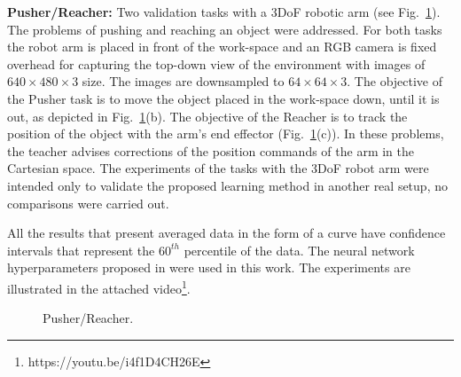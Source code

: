 \textbf{Pusher/Reacher:} Two validation tasks with a 3DoF robotic arm (see Fig.~\ref{fig:PusherReacher}). The problems of pushing  and reaching an object were addressed.  
For both tasks the robot arm is placed in front of the work-space and an RGB camera is fixed overhead for capturing the top-down view of the environment with images of $640\times480\times3$ size. The images are downsampled to $64\times64\times3$. The objective of the Pusher task is to move the object placed in the work-space down, until it is out, as depicted in Fig.~\ref{fig:PusherReacher}(b). The objective of the Reacher is to track the position of the object with the arm's end effector (Fig.~\ref{fig:PusherReacher}(c)). In these problems, the teacher advises corrections of the position commands of the arm in the Cartesian space. The experiments of the tasks with the 3DoF robot arm were intended only to validate the proposed learning method in another real setup, no comparisons were carried out.

All the results that present averaged data in the form of a curve have confidence intervals that represent the $60^{th}$ percentile of the data.
The neural network hyperparameters proposed in \cite{perez2018interactive} were used in this work. The experiments are illustrated in the attached video\footnote{https://youtu.be/i4f1D4CH26E}. 

\begin{figure}[h]
\centering
{} 
\hspace{0.25cm}
\hspace{0.25cm}
\hspace{0.25cm}
\caption{Pusher/Reacher.} 
\label{fig:PusherReacher} 
\end{figure}


